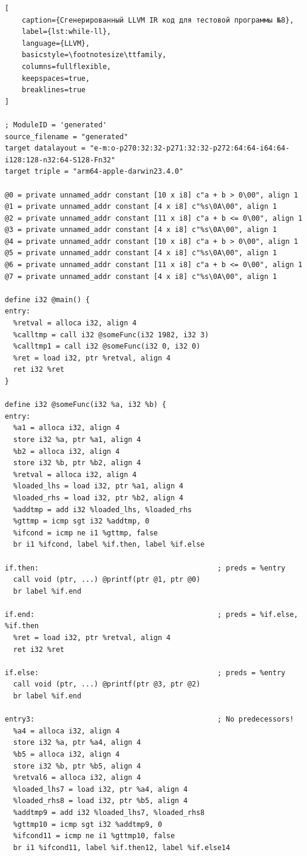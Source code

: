 \begin{lstlisting}[
    caption={Сгенерированный LLVM IR код для тестовой программы №8},
    label={lst:while-ll},
    language={LLVM},
    basicstyle=\footnotesize\ttfamily,
    columns=fullflexible,
    keepspaces=true,
    breaklines=true
]

; ModuleID = 'generated'
source_filename = "generated"
target datalayout = "e-m:o-p270:32:32-p271:32:32-p272:64:64-i64:64-i128:128-n32:64-S128-Fn32"
target triple = "arm64-apple-darwin23.4.0"

@0 = private unnamed_addr constant [10 x i8] c"a + b > 0\00", align 1
@1 = private unnamed_addr constant [4 x i8] c"%s\0A\00", align 1
@2 = private unnamed_addr constant [11 x i8] c"a + b <= 0\00", align 1
@3 = private unnamed_addr constant [4 x i8] c"%s\0A\00", align 1
@4 = private unnamed_addr constant [10 x i8] c"a + b > 0\00", align 1
@5 = private unnamed_addr constant [4 x i8] c"%s\0A\00", align 1
@6 = private unnamed_addr constant [11 x i8] c"a + b <= 0\00", align 1
@7 = private unnamed_addr constant [4 x i8] c"%s\0A\00", align 1

define i32 @main() {
entry:
  %retval = alloca i32, align 4
  %calltmp = call i32 @someFunc(i32 1982, i32 3)
  %calltmp1 = call i32 @someFunc(i32 0, i32 0)
  %ret = load i32, ptr %retval, align 4
  ret i32 %ret
}

define i32 @someFunc(i32 %a, i32 %b) {
entry:
  %a1 = alloca i32, align 4
  store i32 %a, ptr %a1, align 4
  %b2 = alloca i32, align 4
  store i32 %b, ptr %b2, align 4
  %retval = alloca i32, align 4
  %loaded_lhs = load i32, ptr %a1, align 4
  %loaded_rhs = load i32, ptr %b2, align 4
  %addtmp = add i32 %loaded_lhs, %loaded_rhs
  %gttmp = icmp sgt i32 %addtmp, 0
  %ifcond = icmp ne i1 %gttmp, false
  br i1 %ifcond, label %if.then, label %if.else

if.then:                                          ; preds = %entry
  call void (ptr, ...) @printf(ptr @1, ptr @0)
  br label %if.end

if.end:                                           ; preds = %if.else, %if.then
  %ret = load i32, ptr %retval, align 4
  ret i32 %ret

if.else:                                          ; preds = %entry
  call void (ptr, ...) @printf(ptr @3, ptr @2)
  br label %if.end

entry3:                                           ; No predecessors!
  %a4 = alloca i32, align 4
  store i32 %a, ptr %a4, align 4
  %b5 = alloca i32, align 4
  store i32 %b, ptr %b5, align 4
  %retval6 = alloca i32, align 4
  %loaded_lhs7 = load i32, ptr %a4, align 4
  %loaded_rhs8 = load i32, ptr %b5, align 4
  %addtmp9 = add i32 %loaded_lhs7, %loaded_rhs8
  %gttmp10 = icmp sgt i32 %addtmp9, 0
  %ifcond11 = icmp ne i1 %gttmp10, false
  br i1 %ifcond11, label %if.then12, label %if.else14


\end{lstlisting}
